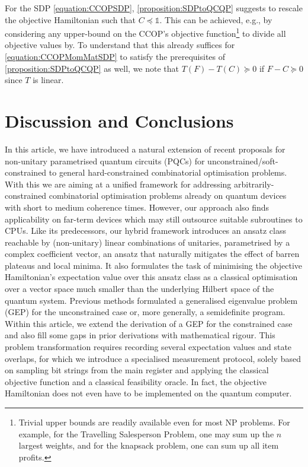 \documentclass[10pt,conference]{IEEEtran}
\newcommand*{\one}{\mathds{1}}        %
\begin{document}
For the SDP \eqref{equation:CCOPSDP}, \autoref{proposition:SDPtoQCQP} suggests to rescale the objective Hamiltonian such that $C \preceq \one$.
This can be achieved, e.g., by considering any upper-bound on the CCOP's objective function\footnote{
    Trivial upper bounds are readily available even for most NP problems.
    For example, for the Travelling Salesperson Problem, one may sum up the $n$ largest weights,
    and for the knapsack problem, one can sum up all item profits.
} to divide all objective values by.
To understand that this already suffices for \eqref{equation:CCOPMomMatSDP} to satisfy the prerequisites of \autoref{proposition:SDPtoQCQP} as well, we note that $T(F) - T(C) \succeq 0$ if $F - C \succeq 0$ since $T$ is linear.


\section{\label{section:DiscussionAndConclusion}Discussion and Conclusions}

In this article, we have introduced a natural extension of recent proposals for non-unitary parametrised quantum circuits (PQCs) for unconstrained/soft-constrained to general hard-constrained combinatorial optimisation problems.
With this we are aiming at a unified framework for addressing arbitrarily-constrained combinatorial optimisation problems already on quantum devices with short to medium coherence times.
However, our approach also finds applicability on far-term devices which may still outsource suitable subroutines to CPUs.
Like its predecessors, our hybrid framework introduces an ansatz class reachable by (non-unitary) linear combinations of unitaries, parametrised by a complex coefficient vector, an ansatz that naturally mitigates the effect of barren plateaus and local minima.
It also formulates the task of minimising the objective Hamiltonian's expectation value over this ansatz class as a classical optimisation over a vector space much smaller than the underlying Hilbert space of the quantum system.
Previous methods formulated a generalised eigenvalue problem (GEP) for the unconstrained case or, more generally, a semidefinite program.
Within this article, we extend the derivation of a GEP for the constrained case and also fill some gaps in prior derivations with mathematical rigour.
This problem transformation requires recording several expectation values and state overlaps, for which we introduce a specialised measurement protocol, solely based on sampling bit strings from the main register and applying the classical objective function and a classical feasibility oracle.
In fact, the objective Hamiltonian does not even have to be implemented on the quantum computer.
\end{document}
